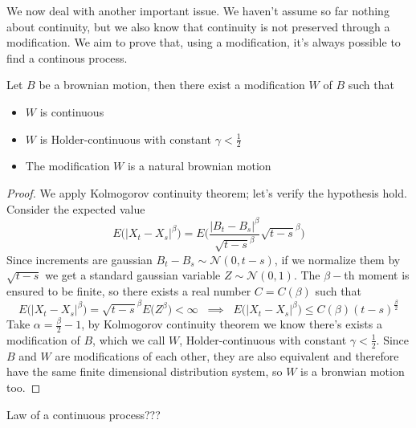 We now deal with another important issue. We haven't assume so far nothing about continuity, but we also know that continuity is not preserved through a modification. We aim to prove that, using a modification, it's always possible to find a continous process. 

\begin{theorem}
    Let $B$ be a brownian motion, then there exist a modification $W$ of $B$ such that
    \begin{itemize}
        \item $W$ is continuous
        \item $W$ is Holder-continuous with constant $\gamma < \frac{1}{2}$
        \item The modification $W$ is a natural brownian motion
    \end{itemize}
\end{theorem}
\begin{proof}
    We apply Kolmogorov continuity theorem; let's verify the hypothesis hold. Consider the expected value
    \begin{equation*}
        E\Big( \vert X_t - X_s \vert^{\beta} \Big) = E \Bigg( \frac{\vert B_t - B_s \vert^{\beta}}{\sqrt{t-s}^{\beta}} \sqrt{t-s}^{\beta} \Bigg)  
    \end{equation*}
    Since increments are gaussian $B_t - B_s \sim \mathcal{N}(0,t-s)$, if we normalize them by $\sqrt{t-s}$ we get a standard gaussian variable $Z \sim \mathcal{N}(0,1)$.  The $\beta-$th moment is ensured to be finite, so there exists a real number $C = C(\beta)$ such that
    \begin{equation*}
        E\Big( \vert X_t - X_s \vert^{\beta} \Big) = \sqrt{t-s}^{\beta} E\big(Z^{\beta}\big) < \infty \;\; \implies \;\; E\Big( \vert X_t - X_s \vert^{\beta} \Big) \leq C(\beta) (t-s)^{\frac{\beta}{2}}
    \end{equation*}
    Take $\alpha = \frac{\beta}{2}-1$, by Kolmogorov continuity theorem we know there's exists a modification of $B$, which we call $W$, Holder-continuous with constant $\gamma < \frac{1}{2}$. Since $B$ and $W$ are modifications of each other, they are also equivalent and therefore have the same finite dimensional distribution system, so $W$ is a bronwian motion too.  
\end{proof}

Law of a continuous process???


